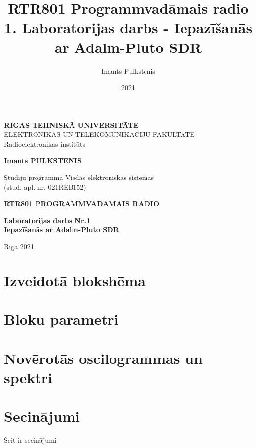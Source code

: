 \documentclass[a4paper,12pt]{extarticle}    %
\author{Imants Pulkstenis}
\title{RTR801 Programmvadāmais radio 1. Laboratorijas darbs - Iepazīšanās ar Adalm-Pluto SDR}
\date{2021}
\begin{document}
\begin{titlepage}
	\centering
	{ \normalsize \textbf{\uppercase{Rīgas  Tehniskā  Universitāte} }\\
	 \uppercase{Elektronikas un Telekomunikāciju fakultāte}\\
	 Radioelektronikas institūts
	 \par}
	\vspace{3cm}
	{\Large \textbf{Imants PULKSTENIS}\par}

	{\large Studiju programma Viedās elektroniskās sistēmas\\}
	{\Large (stud. apl. nr. 021REB152)\\}
	\vspace{3cm}
	{\Large \textbf{ \uppercase{RTR801 Programmvadāmais radio}}\par}
	{\large \textbf{Laboratorijas darbs Nr.1}\\}
	{\large \textbf{Iepazīšanās ar Adalm-Pluto SDR}\\}
	\vfill
	
	\vfill

	{\begin{center}
		\large Rīga 2021
	\end{center} }
\end{titlepage}
%
\section{Izveidotā blokshēma}
%
%
% 
%
\section{Bloku parametri}
%
\section{Novērotās oscilogrammas un spektri}
% 
\section{Secinājumi}
%
Šeit ir secinājumi
%
%
\end{document}
